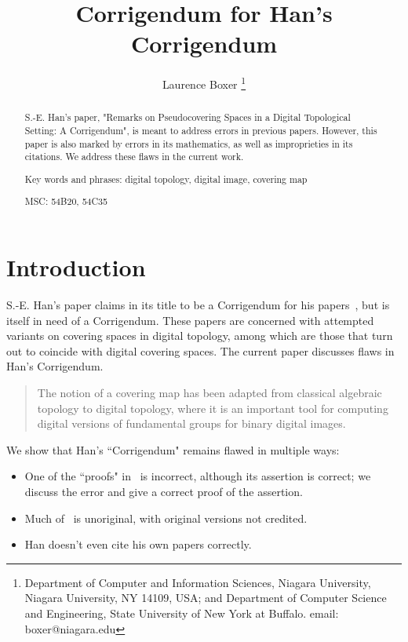 \documentclass{article} \UseRawInputEncoding
\title{Corrigendum for Han's Corrigendum}
\author{Laurence Boxer
\thanks{
    Department of Computer and Information Sciences,
    Niagara University,
    Niagara University, NY 14109, USA; \newline
    and \newline
    Department of Computer Science and Engineering,
    State University of New York at Buffalo. \newline
    email: boxer@niagara.edu
}
}
\date{ }
\theoremstyle{plain}
\theoremstyle{definition}
\numberwithin{thm}{section}
\begin{document}
\maketitle{}

\begin{abstract}
S.-E. Han's paper, "Remarks on Pseudocovering Spaces in a Digital Topological Setting:
A Corrigendum", is meant to address errors in previous papers. However, this paper
is also marked by errors in its mathematics, as well as improprieties in its citations.
We address these flaws in the current work.

Key words and phrases: digital topology, digital image, covering map

MSC: 54B20, 54C35
\end{abstract}

\maketitle

\section{Introduction}
S.-E. Han's paper \cite{HanCorrig} claims in its title to be a Corrigendum
for his papers~\cite{HanUnique,HanEquiv}, but is
itself in need of a Corrigendum. These papers are concerned with
attempted variants on covering spaces in digital topology, among which are those that
turn out to coincide with digital covering spaces.
The current paper discusses flaws in Han's Corrigendum.

\begin{quote}
    The notion of a covering map has been adapted from
classical algebraic topology to digital topology,
where it is an important tool for computing
digital versions of fundamental groups for binary
digital images. \cite{BxVariants}
\end{quote}

We show that Han's ``Corrigendum" remains flawed in multiple ways:
\begin{itemize}
    \item One of the ``proofs" in~\cite{HanCorrig} is incorrect, although its
          assertion is correct; we discuss the error and give a correct proof 
          of the assertion.
    \item Much of~\cite{HanCorrig} is unoriginal, with original versions not credited.
    \item Han doesn't even cite his own papers correctly.     
\end{itemize}
\end{document}
